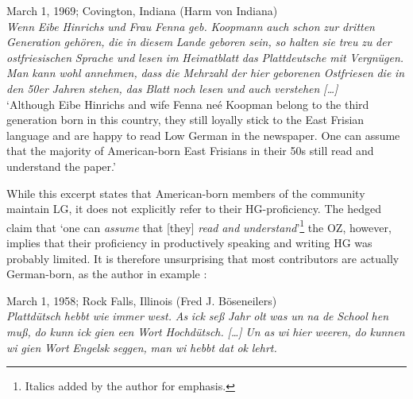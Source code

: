\documentclass[output=paper]{langsci/langscibook}
\begin{document}
\ea
\label{ex:rocker:1}
March 1, 1969; Covington, Indiana (Harm von Indiana)\\

\textit{Wenn} \textit{Eibe} \textit{Hinrichs} \textit{und} \textit{Frau} \textit{Fenna} \textit{geb.} \textit{Koopmann} \textit{auch} \textit{schon} \textit{zur} \textit{dritten} \textit{Generation} \textit{gehören,} \textit{die} \textit{in} \textit{diesem} \textit{Lande} \textit{geboren} \textit{sein,} \textit{so} \textit{halten} \textit{sie} \textit{treu} \textit{zu} \textit{der} \textit{ostfriesischen} \textit{Sprache} \textit{und} \textit{lesen} \textit{im} \textit{Heimatblatt} \textit{das} \textit{Plattdeutsche} \textit{mit} \textit{Vergnügen.} \textit{Man} \textit{kann} \textit{wohl} \textit{annehmen,} \textit{dass} \textit{die} \textit{Mehrzahl} \textit{der} \textit{hier} \textit{geborenen} \textit{Ostfriesen} \textit{die} \textit{in} \textit{den} \textit{50er} \textit{Jahren}  \textit{stehen,} \textit{das} \textit{Blatt} \textit{noch} \textit{lesen} \textit{und} \textit{auch} \textit{verstehen} \textit{[…]}\\

‘Although Eibe Hinrichs and wife Fenna neé Koopman belong to the third generation  born in this country, they still loyally stick to the East Frisian language and are happy to  read Low German in the newspaper. One can assume that the majority of American-born East Frisians in their 50s still read and understand the paper.’
\z



While this excerpt states that American-born members of the community maintain LG, it does not explicitly refer to their HG-proficiency. The hedged claim that ‘one can \textit{assume} that [they] \textit{read} \textit{and} \textit{understand}’\footnote{Italics added by the author for emphasis.} the OZ, however, implies that their proficiency in productively speaking and writing HG was probably limited. It is therefore unsurprising that most contributors are actually German-born, as the author in example : 


\ea
\label{ex:rocker:2}
March 1, 1958; Rock Falls, Illinois (Fred J. Böseneilers)\\

\textit{Plattdütsch} \textit{hebbt} \textit{wie} \textit{immer} \textit{west.} \textit{As} \textit{ick} \textit{seß} \textit{Jahr} \textit{olt} \textit{was} \textit{un} \textit{na} \textit{de} \textit{School} \textit{hen} \textit{muß,} \textit{do}  \textit{kunn} \textit{ick} \textit{gien} \textit{een} \textit{Wort} \textit{Hochdütsch.} \textit{[…]} \textit{Un} \textit{as} \textit{wi} \textit{hier} \textit{weeren,} \textit{do} \textit{kunnen} \textit{wi} \textit{gien} \textit{Wort}  \textit{Engelsk} \textit{seggen,} \textit{man} \textit{wi} \textit{hebbt} \textit{dat} \textit{ok} \textit{lehrt.} \\
\end{document}
